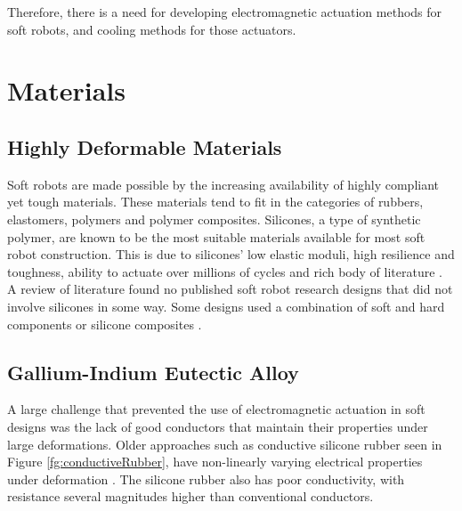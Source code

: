 \documentclass[a4paper,12pt]{article}
\begin{document}
Therefore, there is a need for developing electromagnetic actuation methods for soft robots, and cooling methods for those actuators.

\section{Materials}

\subsection{Highly Deformable Materials}
Soft robots are made possible by the increasing availability of highly compliant yet tough materials. These materials tend to fit in the categories of rubbers, elastomers, polymers and polymer composites. Silicones, a type of synthetic polymer, are known to be the most suitable materials available for most soft robot construction. This is due to silicones’ low elastic moduli, high resilience and toughness, ability to actuate over millions of cycles and rich body of literature \cite{polygerinosSoftRoboticsReview2017}. A review of literature found no published soft robot research designs that did not involve silicones in some way. Some designs used a combination of soft and hard components \cite{stokesHybridCombiningHard2013} or silicone composites \cite{laschiSoftRobotArm2012}.

\subsection{Gallium-Indium Eutectic Alloy}
A large challenge that prevented the use of electromagnetic actuation in soft designs was the lack of good conductors that maintain their properties under large deformations. Older approaches such as conductive silicone rubber seen in Figure \ref{fg:conductiveRubber}, have non-linearly varying electrical properties under deformation \cite{valentaMechanicalElectricalTesting2008}. The silicone rubber also has poor conductivity, with resistance several magnitudes higher than conventional conductors.
\end{document}
